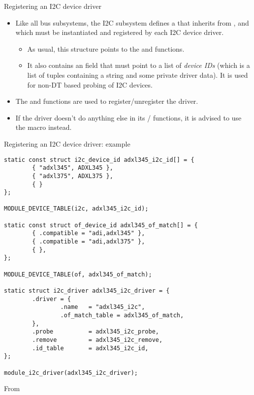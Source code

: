 \begin{frame}{Registering an I2C device driver}
  \begin{itemize}
  \item Like all bus subsystems, the I2C subsystem defines a
     that inherits from
    , and which must be instantiated and
    registered by each I2C device driver.
    \begin{itemize}
    \item As usual, this structure points to the  and
       functions.
    \item It also contains an  field that must point to a
      list of {\em device IDs} (which is a list of tuples containing a
      string and some private driver data). It is used for non-DT based
      probing of I2C devices.
    \end{itemize}
  \item The  and  functions
    are used to register/unregister the driver.
  \item If the driver doesn't do anything else in its
    / functions, it is advised to use
    the  macro instead.
  \end{itemize}
\end{frame}

\begin{frame}[fragile]{Registering an I2C device driver: example}
  \begin{block}{}
  \begin{verbatim}
static const struct i2c_device_id adxl345_i2c_id[] = {
        { "adxl345", ADXL345 },
        { "adxl375", ADXL375 },
        { }
};

MODULE_DEVICE_TABLE(i2c, adxl345_i2c_id);

static const struct of_device_id adxl345_of_match[] = {
        { .compatible = "adi,adxl345" },
        { .compatible = "adi,adxl375" },
        { },
};

MODULE_DEVICE_TABLE(of, adxl345_of_match);

static struct i2c_driver adxl345_i2c_driver = {
        .driver = {
                .name   = "adxl345_i2c",
                .of_match_table = adxl345_of_match,
        },
        .probe          = adxl345_i2c_probe,
        .remove         = adxl345_i2c_remove,
        .id_table       = adxl345_i2c_id,
};

module_i2c_driver(adxl345_i2c_driver);
\end{verbatim}
\end{block}
\small
From 
\end{frame}

